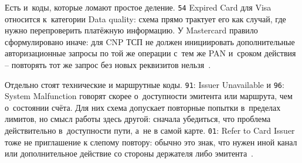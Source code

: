 Есть и~коды, которые ломают простое деление. \texttt{54} Expired Card для
Visa относится к~категории Data quality: схема прямо трактует
его как случай, где нужно перепроверить платёжную информацию. У
Mastercard правило сформулировано иначе: для CNP ТСП не
должен инициировать дополнительные авторизационные запросы по той же
операции с~тем же PAN и~сроком действия -- повторять тот же запрос без новых реквизитов
нельзя~\cite{visa-core-rules,mc-tpr}.

Отдельно стоят технические и маршрутные коды. \texttt{91}: Issuer
Unavailable и \texttt{96}: System Malfunction говорят скорее о~доступности
эмитента или маршрута, чем о~состоянии счёта. Для них схема допускает
повторные попытки в~пределах лимитов, но смысл работы здесь другой:
сначала убедиться, что проблема действительно в~доступности пути, а~не в
самой карте. \texttt{01}: Refer to Card Issuer тоже не приглашение к
слепому повтору: обычно это знак, что нужен иной канал или
дополнительное действие со стороны держателя либо
эмитента~\cite{visa-core-rules}.

